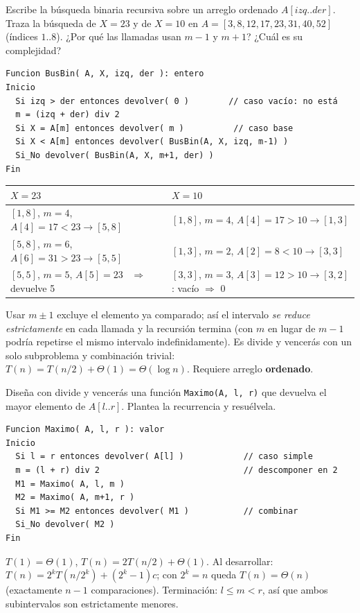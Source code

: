 \begin{prob}
Escribe la búsqueda binaria recursiva sobre un arreglo ordenado $A[izq..der]$. Traza la búsqueda de $X=23$ y de $X=10$ en $A=[3,8,12,17,23,31,40,52]$ (índices $1..8$). ¿Por qué las llamadas usan $m-1$ y $m+1$? ¿Cuál es su complejidad?
\end{prob}
\begin{sol}
\begin{lstlisting}
Funcion BusBin( A, X, izq, der ): entero
Inicio
  Si izq > der entonces devolver( 0 )        // caso vacío: no está
  m = (izq + der) div 2
  Si X = A[m] entonces devolver( m )          // caso base
  Si X < A[m] entonces devolver( BusBin(A, X, izq, m-1) )
  Si_No devolver( BusBin(A, X, m+1, der) )
Fin
\end{lstlisting}
\begin{tabular}{@{}l|l@{}}
$X=23$ & $X=10$\\\hline
$[1,8]$, $m=4$, $A[4]=17<23\to[5,8]$ & $[1,8]$, $m=4$, $A[4]=17>10\to[1,3]$\\
$[5,8]$, $m=6$, $A[6]=31>23\to[5,5]$ & $[1,3]$, $m=2$, $A[2]=8<10\to[3,3]$\\
$[5,5]$, $m=5$, $A[5]=23$ \ $\Rightarrow$ devuelve 5 & $[3,3]$, $m=3$, $A[3]=12>10\to[3,2]$: vacío $\Rightarrow$ 0
\end{tabular}

Usar $m\pm1$ excluye el elemento ya comparado; así el intervalo \emph{se reduce estrictamente} en cada llamada y la recursión termina (con $m$ en lugar de $m-1$ podría repetirse el mismo intervalo indefinidamente). Es divide y vencerás con un solo subproblema y combinación trivial: $T(n)=T(n/2)+\Theta(1)=\Theta(\log n)$. Requiere arreglo \textbf{ordenado}.
\end{sol}

\begin{prob}
Diseña con divide y vencerás una función \texttt{Maximo(A, l, r)} que devuelva el mayor elemento de $A[l..r]$. Plantea la recurrencia y resuélvela.
\end{prob}
\begin{sol}
\begin{lstlisting}
Funcion Maximo( A, l, r ): valor
Inicio
  Si l = r entonces devolver( A[l] )            // caso simple
  m = (l + r) div 2                             // descomponer en 2
  M1 = Maximo( A, l, m )
  M2 = Maximo( A, m+1, r )
  Si M1 >= M2 entonces devolver( M1 )           // combinar
  Si_No devolver( M2 )
Fin
\end{lstlisting}
$T(1)=\Theta(1)$, $T(n)=2T(n/2)+\Theta(1)$. Al desarrollar: $T(n)=2^kT(n/2^k)+(2^k-1)c$; con $2^k=n$ queda $T(n)=\Theta(n)$ (exactamente $n-1$ comparaciones). Terminación: $l\le m<r$, así que ambos subintervalos son estrictamente menores.
\end{sol}

